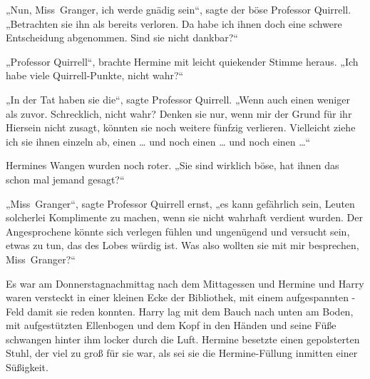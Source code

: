 „Nun, Miss~Granger, ich werde gnädig sein“, sagte der böse Professor Quirrell.
„Betrachten sie ihn als bereits verloren. Da habe ich ihnen doch eine schwere Entscheidung abgenommen. Sind sie nicht dankbar?“

„Professor Quirrell“, brachte Hermine mit leicht quiekender Stimme heraus.
„Ich habe viele Quirrell-Punkte, nicht wahr?“

„In der Tat haben sie die“, sagte Professor Quirrell.
„Wenn auch einen weniger als zuvor. Schrecklich, nicht wahr? Denken sie nur, wenn mir der Grund für ihr Hiersein nicht zusagt, könnten sie noch weitere fünfzig verlieren. Vielleicht ziehe ich sie ihnen einzeln ab, einen … und noch einen … und noch einen …“

Hermines Wangen wurden noch roter.
„Sie sind wirklich böse, hat ihnen das schon mal jemand gesagt?“

„Miss~Granger“, sagte Professor Quirrell ernst, „es kann gefährlich sein, Leuten solcherlei Komplimente zu machen, wenn sie nicht wahrhaft verdient wurden. Der Angesprochene könnte sich verlegen fühlen und ungenügend und versucht sein, etwas zu tun, das des Lobes würdig ist. Was also wollten sie mit mir besprechen, Miss~Granger?“

\later

Es war am Donnerstagnachmittag nach dem Mittagessen und Hermine und Harry waren versteckt in einer kleinen Ecke der Bibliothek, mit einem aufgespannten -Feld damit sie reden konnten. Harry lag mit dem Bauch nach unten am Boden, mit aufgestützten Ellenbogen und dem Kopf in den Händen und seine Füße schwangen hinter ihm locker durch die Luft. Hermine besetzte einen gepolsterten Stuhl, der viel zu groß für sie war, als sei sie die Hermine-Füllung inmitten einer Süßigkeit.

